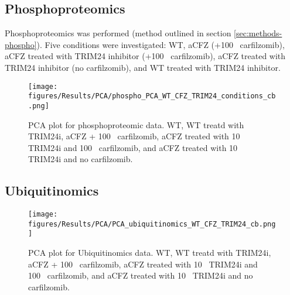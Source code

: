 \subsection{Phosphoproteomics}\label{subsec:omics-phospho}
Phosphoproteomics was performed (method outlined in section \ref{sec:methods-phospho}).
Five conditions were investigated: WT, aCFZ (+100\si{\nano\Molar} carfilzomib), aCFZ treated with TRIM24 inhibitor (+100\si{\nano\Molar} carfilzomib), aCFZ treated with TRIM24 inhibitor (no carfilzomib), and WT treated with TRIM24 inhibitor.

\begin{figure}[htb]
\centering
\texttt{[image: figures/Results/PCA/phospho\_PCA\_WT\_CFZ\_TRIM24\_conditions\_cb.png]}
\caption[Phosphoproteomics PCA]{PCA plot for phosphoproteomic data.
WT, WT treatd with TRIM24i, aCFZ + 100\si{\nano\Molar} carfilzomib, aCFZ treated with 10\si{\mu\Molar} TRIM24i and 100\si{\nano\Molar} carfilzomib, and aCFZ treated with 10\si{\micro\Molar} TRIM24i and no carfilzomib.}
\label{fig:phospho_PCA}
\end{figure}

\subsection{Ubiquitinomics}\label{subsec:omics-glygly}

\begin{figure}[htb]
\centering
\texttt{[image: figures/Results/PCA/PCA\_ubiquitinomics\_WT\_CFZ\_TRIM24\_cb.png]}
\caption[Ubiquitinomics PCA]{PCA plot for Ubiquitinomics data.
WT, WT treatd with TRIM24i, aCFZ + 100\si{\nano\Molar} carfilzomib, aCFZ treated with 10\si{\mu\Molar} TRIM24i and 100\si{\nano\Molar} carfilzomib, and aCFZ treated with 10\si{\micro\Molar} TRIM24i and no carfilzomib.}
\label{fig:glygly_PCA}
\end{figure}


